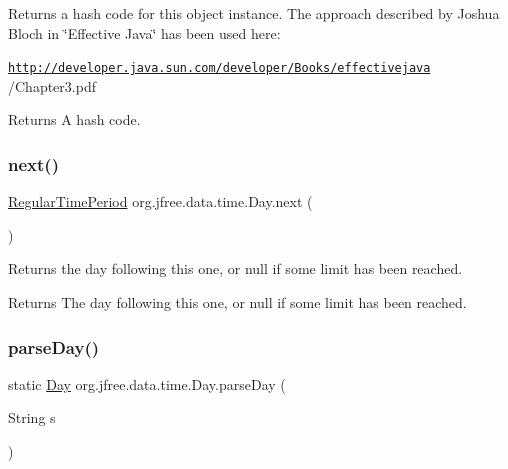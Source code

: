 Returns a hash code for this object instance. The approach described by Joshua Bloch in \char`\"{}\+Effective Java\char`\"{} has been used here\+: 

{\ttfamily \href{http://developer.java.sun.com/developer/Books/effectivejava}{\tt http\+://developer.\+java.\+sun.\+com/developer/\+Books/effectivejava} /\+Chapter3.pdf}

\begin{DoxyReturn}{Returns}
A hash code. 
\end{DoxyReturn}
\mbox{\label{classorg_1_1jfree_1_1data_1_1time_1_1_day_aad0dd966ec94fe5fdc994fbfb6bcea8e}} 
\subsubsection{\texorpdfstring{next()}{next()}}
{\footnotesize\ttfamily \mbox{\hyperlink{classorg_1_1jfree_1_1data_1_1time_1_1_regular_time_period}{Regular\+Time\+Period}} org.\+jfree.\+data.\+time.\+Day.\+next (\begin{DoxyParamCaption}{ }\end{DoxyParamCaption})}

Returns the day following this one, or {\ttfamily null} if some limit has been reached.

\begin{DoxyReturn}{Returns}
The day following this one, or {\ttfamily null} if some limit has been reached. 
\end{DoxyReturn}
\mbox{\label{classorg_1_1jfree_1_1data_1_1time_1_1_day_a2a6cfeb8ba36658ba709fbb2e5548ad9}} 
\subsubsection{\texorpdfstring{parse\+Day()}{parseDay()}}
{\footnotesize\ttfamily static \mbox{\hyperlink{classorg_1_1jfree_1_1data_1_1time_1_1_day}{Day}} org.\+jfree.\+data.\+time.\+Day.\+parse\+Day (\begin{DoxyParamCaption}\item[{String}]{s }\end{DoxyParamCaption})\hspace{0.3cm}{\ttfamily [static]}}

